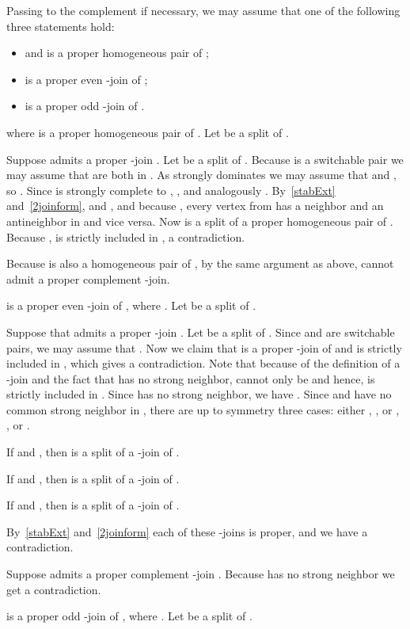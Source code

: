 \documentclass[11 pt] {article}
\newcounter{claim}
\begin{document}
Passing to the complement if necessary, we may assume that one of the
following three statements hold:
\begin{itemize}
\item  and  is a proper homogeneous pair of ;
\item  is a proper even -join of ;
\item  is a proper odd -join of .
\end{itemize}

  where  is a proper
homogeneous pair of . Let  be a split of . 


Suppose  admits a proper -join . Let
 be a split of . Because 
is a switchable pair we may assume that  are both in . As
 strongly dominates  we may assume that  and
, so . Since  is strongly complete
to , , and analogously .
By~\ref{stabExt} and~\ref{2joinform},  and , and because
, every vertex from  has a neighbor and an
antineighbor in  and vice versa. Now  is
a split of a proper homogeneous pair of . Because ,
 is strictly included in , a contradiction.

Because  is also a homogeneous pair of , by the
same argument as above,  cannot admit a proper complement -join.


  is a proper even -join
 of , where . Let  be a split of
.

Suppose that  admits a proper -join . Let
 be a split of . Since
 and  are switchable pairs, we may assume that . Now we claim that  is a proper
-join of  and  is strictly included in , which gives a
contradiction. Note that because of the definition of a -join and
the fact that  has no strong neighbor,  cannot only be  and hence,  is strictly included in .  Since  has
no strong neighbor, we have . Since  and  have no
common strong neighbor in , there are up to symmetry three
cases: either , , or , ,
or .

If  and , then  is a split of a  -join of .

If  and , then  is
a split of a -join of .

If  and , then  is a split of a  -join of
.

By~\ref{stabExt} and~\ref{2joinform} each of these -joins is proper, and we have a
contradiction.

Suppose  admits a proper complement -join . Because
 has no strong neighbor we get a contradiction.



  is a proper odd -join
 of , where . Let  be a split of
.
\end{document}
